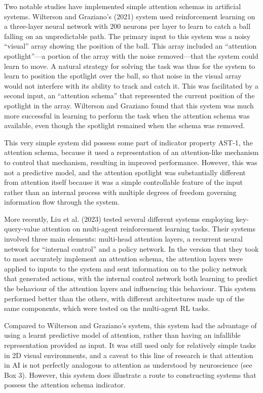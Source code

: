 \documentclass[12pt]{article}
\begin{document}
Two notable studies have implemented simple attention schemas in artificial systems. Wilterson and Graziano’s (2021) system used reinforcement learning on a three-layer neural network with 200 neurons per layer to learn to catch a ball falling on an unpredictable path. The primary input to this system was a noisy ``visual'' array showing the position of the ball. This array included an ``attention spotlight''—a portion of the array with the noise removed—that the system could learn to move. A natural strategy for solving the task was thus for the system to learn to position the spotlight over the ball, so that noise in the visual array would not interfere with its ability to track and catch it. This was facilitated by a second input, an ``attention schema'' that represented the current position of the spotlight in the array. Wilterson and Graziano found that this system was much more successful in learning to perform the task when the attention schema was available, even though the spotlight remained when the schema was removed.

This very simple system did possess some part of indicator property AST-1, the attention schema, because it used a representation of an attention-like mechanism to control that mechanism, resulting in improved performance. However, this was not a predictive model, and the attention spotlight was substantially different from attention itself because it was a simple controllable feature of the input rather than an internal process with multiple degrees of freedom governing information flow through the system.

More recently, Liu et al. (2023) tested several different systems employing key-query-value attention on multi-agent reinforcement learning tasks. Their systems involved three main elements: multi-head attention layers, a recurrent neural network for ``internal control'' and a policy network. In the version that they took to most accurately implement an attention schema, the attention layers were applied to inputs to the system and sent information on to the policy network that generated actions, with the internal control network both learning to predict the behaviour of the attention layers and influencing this behaviour. This system performed better than the others, with different architectures made up of the same components, which were tested on the multi-agent RL tasks.

Compared to Wilterson and Graziano’s system, this system had the advantage of using a learnt predictive model of attention, rather than having an infallible representation provided as input. It was still used only for relatively simple tasks in 2D visual environments, and a caveat to this line of research is that attention in AI is not perfectly analogous to attention as understood by neuroscience (see Box 3). However, this system does illustrate a route to constructing systems that possess the attention schema indicator.
\end{document}
